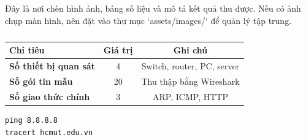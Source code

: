 \section{\sectionresultstitle}
Đây là nơi chèn hình ảnh, bảng số liệu và mô tả kết quả thu được. Nếu có ảnh chụp màn hình, nên đặt vào thư mục `assets/images/` để quản lý tập trung.

\begin{table}[H]
    \centering
    \caption{\sampletablecaption}
    \begin{tabular}{>{\bfseries}lcc}
        \toprule
        Chỉ tiêu & Giá trị & Ghi chú \\
        \midrule
        Số thiết bị quan sát & 4 & Switch, router, PC, server \\
        Số gói tin mẫu & 20 & Thu thập bằng Wireshark \\
        Số giao thức chính & 3 & ARP, ICMP, HTTP \\
        \bottomrule
    \end{tabular}
\end{table}

\begin{lstlisting}[style=engineering,caption={\samplelistingcaption}]
ping 8.8.8.8
tracert hcmut.edu.vn
\end{lstlisting}
